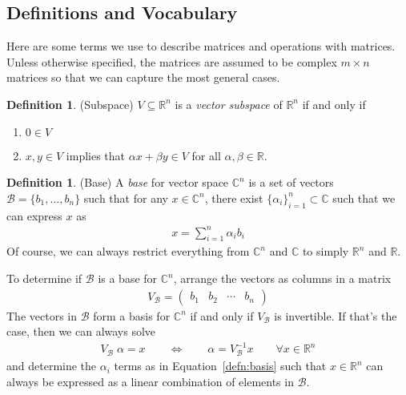 \documentclass[12pt]{article}
\numberwithin{equation}{section} %
\theoremstyle{plain}
\theoremstyle{definition}
\newtheorem{defn}[thm]{Definition}
\theoremstyle{remark}
\newcommand{\R}{\mathbb{R}}
\newcommand{\Rn}{\mathbb{R}^n}
\newcommand{\C}{\mathbb{C}}
\newcommand{\Cn}{\mathbb{C}^n}
\begin{document}
\subsection{Definitions and Vocabulary}

Here are some terms we use to describe matrices and operations with
matrices. Unless otherwise specified, the matrices are assumed to be
complex $m\times n$ matrices so that we can capture the most general
cases.

\begin{defn}{(Subspace)}
$V\subseteq \Rn$ is a \emph{vector subspace} of $\Rn$ if and only if
\begin{enumerate}
  \item $0 \in V$
  \item $x,y\in V$ implies that $\alpha x + \beta y \in V$ for all
    $\alpha,\beta\in \R$.
\end{enumerate}
\end{defn}

\begin{defn}{(Base)}
A \emph{base} for vector space $\Cn$ is a set of vectors
$\mathcal{B}=\{b_1,\ldots,b_n\}$ such that for any $x\in \Cn$, there
exist $\{\alpha_i\}_{i=1}^n \subset \C$ such that we can express $x$ as
\begin{align}
  x = \sum^n_{i=1} \alpha_i b_i
  \label{defn:basis}
\end{align}
Of course, we can always restrict everything from $\Cn$ and $\C$ to
simply $\Rn$ and $\R$.

To determine if $\mathcal{B}$ is a base for $\Cn$, arrange the vectors
as columns in a matrix
\begin{align*}
  V_\mathcal{B} = \begin{pmatrix} b_1 & b_2 &\cdots & b_n \end{pmatrix}
\end{align*}
The vectors in $\mathcal{B}$ form a basis for $\Cn$ if and only if
$V_\mathcal{B}$ is invertible. If that's the case, then we can always
solve
\begin{align*}
  V_\mathcal{B} \;\alpha = x
  \qquad\Leftrightarrow\qquad
  \alpha = V_\mathcal{B}^{-1} x
  \qquad \forall x\in \Rn
\end{align*}
and determine the $\alpha_i$ terms as in Equation~\ref{defn:basis} such
that $x \in \Rn$ can always be expressed as a linear combination of
elements in $\mathcal{B}$.
\end{defn}
\end{document}
